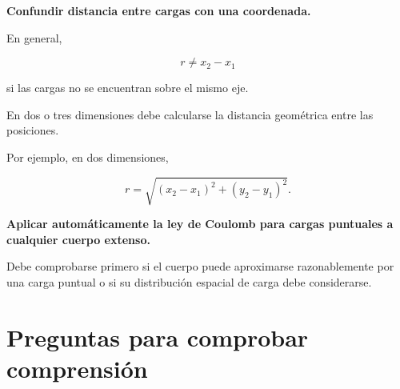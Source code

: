 \begin{errorfrecuente}

\textbf{Confundir distancia entre cargas con una coordenada.}

En general,

\[
r\neq x_2-x_1
\]

si las cargas no se encuentran sobre el mismo eje.

En dos o tres dimensiones debe calcularse la distancia geométrica entre las
posiciones.

Por ejemplo, en dos dimensiones,

\[
r
=
\sqrt{
(x_2-x_1)^2
+
(y_2-y_1)^2
}.
\]

\end{errorfrecuente}


\begin{errorfrecuente}

\textbf{Aplicar automáticamente la ley de Coulomb para cargas puntuales a
cualquier cuerpo extenso.}

Debe comprobarse primero si el cuerpo puede aproximarse razonablemente por
una carga puntual o si su distribución espacial de carga debe considerarse.

\end{errorfrecuente}



\section{Preguntas para comprobar comprensión}

